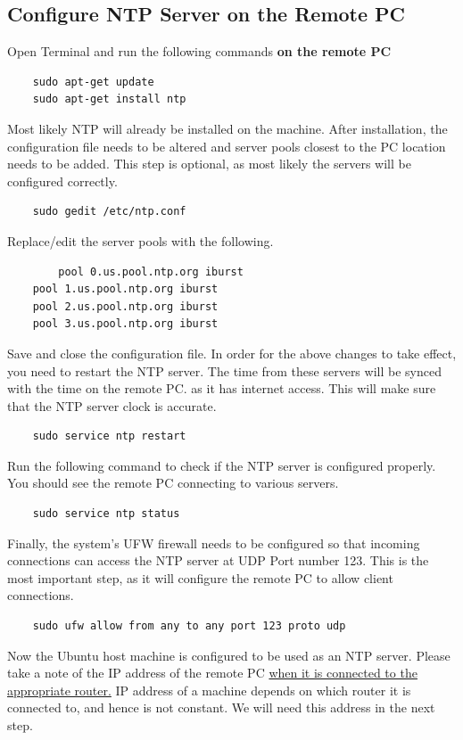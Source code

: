 \documentclass[12]{article}
\begin{document}
\subsection{Configure NTP Server on the Remote PC} 
Open Terminal and run the following commands \textbf{on the remote PC}
\begin{lstlisting}
    sudo apt-get update
    sudo apt-get install ntp
\end{lstlisting}
Most likely NTP will already be installed on the machine. After installation, the configuration file needs to be altered and server pools closest to the PC location needs to be added. This step is optional, as most likely the servers will be configured correctly.
\begin{lstlisting}
    sudo gedit /etc/ntp.conf
\end{lstlisting}
Replace/edit the server pools with the following.
\begin{lstlisting}
    	pool 0.us.pool.ntp.org iburst
	pool 1.us.pool.ntp.org iburst
	pool 2.us.pool.ntp.org iburst
	pool 3.us.pool.ntp.org iburst
\end{lstlisting}
Save and close the configuration file. In order for the above changes to take effect, you need to restart the NTP server. The time from these servers will be synced with the time on the remote PC. as it has internet access. This will make sure that the NTP server clock is accurate.
\begin{lstlisting}
    sudo service ntp restart
\end{lstlisting}
Run the following command to check if the NTP server is configured properly. You should see the remote PC connecting to various servers.
\begin{lstlisting}
    sudo service ntp status
\end{lstlisting}
Finally, the system’s UFW firewall needs to be configured so that incoming connections can access the NTP server at UDP Port number 123. This is the most important step, as it will configure the remote PC to allow client connections.
\begin{lstlisting}
    sudo ufw allow from any to any port 123 proto udp
\end{lstlisting}
Now the Ubuntu host machine is configured to be used as an NTP server. Please take a note of the IP address of the remote PC \underline{when it is connected to the appropriate router.} IP address of a machine depends on which router it is connected to, and hence is not constant. We will need this address in the next step.
\end{document}
